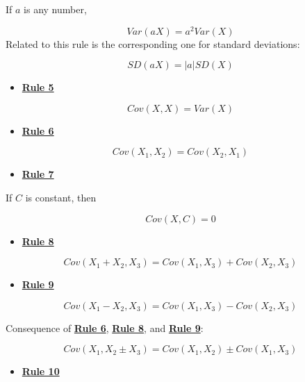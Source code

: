 \documentclass[
]{book}
\providecommand{\tightlist}{%
  \setlength{\itemsep}{0pt}\setlength{\parskip}{0pt}}
\begin{document}
If \(a\) is any number,

\[
Var\left(aX\right) = a^2 Var\left(X\right)
\]
Related to this rule is the corresponding one for standard deviations:

\[
SD\left(aX\right) = \left| a \right| SD\left(X\right)
\]

\begin{itemize}
\tightlist
\item
  \href{./covariance.html\#Rule5}{\textbf{Rule 5}}
\end{itemize}

\[
Cov(X, X) = Var(X)
\]

\begin{itemize}
\tightlist
\item
  \href{./covariance.html\#Rule6}{\textbf{Rule 6}}
\end{itemize}

\[
Cov\left(X_{1}, X_{2}\right) = Cov\left(X_{2}, X_{1}\right)
\]

\begin{itemize}
\tightlist
\item
  \href{./covariance.html\#Rule7}{\textbf{Rule 7}}
\end{itemize}

If \(C\) is constant, then

\[
Cov\left(X, C\right) = 0
\]

\begin{itemize}
\tightlist
\item
  \href{./covariance.html\#Rule8}{\textbf{Rule 8}}
\end{itemize}

\[
Cov\left(X_{1} + X_{2}, X_{3}\right) = Cov\left(X_{1}, X_{3}\right) + Cov\left(X_{2}, X_{3}\right)  
\]

\begin{itemize}
\tightlist
\item
  \href{./covariance.html\#Rule9}{\textbf{Rule 9}}
\end{itemize}

\[
Cov\left(X_{1} - X_{2}, X_{3}\right) = Cov\left(X_{1}, X_{3}\right) - Cov\left(X_{2}, X_{3}\right)  
\]

Consequence of \href{./covariance.html\#Rule6}{\textbf{Rule 6}}, \href{./covariance.html\#Rule8}{\textbf{Rule 8}}, and \href{./covariance.html\#Rule9}{\textbf{Rule 9}}:

\[
Cov\left(X_{1}, X_{2} \pm X_{3}\right) = Cov\left(X_{1}, X_{2}\right) \pm Cov\left(X_{1}, X_{3}\right)  
\]

\begin{itemize}
\tightlist
\item
  \href{./covariance.html\#Rule10}{\textbf{Rule 10}}
\end{itemize}
\end{document}
